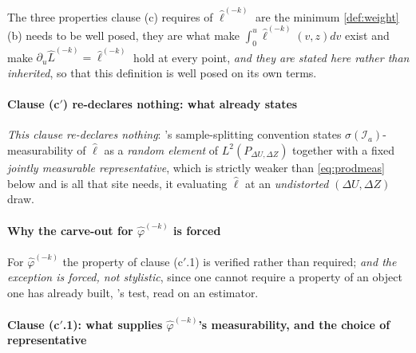 The three properties clause \textup{(c)} requires of $\hat\ell^{(-k)}$ are the minimum
\cref{def:weight}(b) needs to be well posed, they are what make $\int_0^u\hat\ell^{(-k)}(v,z)dv$ exist
and make $\partial_u\hat L^{(-k)}=\hat\ell^{(-k)}$ hold at every point, \emph{and they are stated here
rather than inherited}, so that this definition is well posed on its own terms.

\paragraph{Clause \textup{(c$'$)} re-declares nothing: what  already states}

\emph{This clause re-declares nothing}:
's sample-splitting convention states
$\sigma(\mathcal I_a)$-measurability of $\hat\ell$ as a \emph{random element} of
$L^{2}(P_{\Delta U,\Delta Z})$ together with a fixed \emph{jointly measurable representative}, which is
strictly weaker than \eqref{eq:prodmeas} below and is all that site needs, it evaluating $\hat\ell$ at an
\emph{undistorted} $(\Delta U,\Delta Z)$ draw.

\paragraph{Why the carve-out for $\hat\varphi^{(-k)}$ is forced}

For $\hat\varphi^{(-k)}$ the property of clause \textup{(c$'$.1)} is verified rather than required; \emph{and the exception is forced, not stylistic}, since
one cannot require a property of an object one has already built, 's test, read on an
estimator.

\paragraph{Clause \textup{(c$'$.1)}: what supplies $\hat\varphi^{(-k)}$'s measurability, and the choice of representative}

